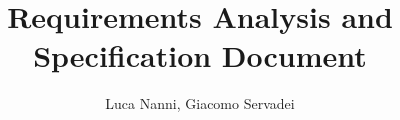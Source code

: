 \documentclass[a4paper]{report}
\begin{document}
\title{\textbf{R}equirements \textbf{A}nalysis and \textbf{S}pecification \textbf{D}ocument}
\author{Luca Nanni, Giacomo Servadei}
\maketitle

\tableofcontents
\listoffigures
\listoftables





\end{document}

